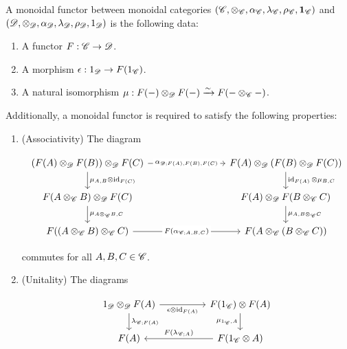 \begin{definition} A monoidal functor between monoidal categories $(\mathscr{C},\otimes_{\mathscr{C}}, \alpha_{\mathscr{C}},\lambda_{\mathscr{C}},\rho_{\mathscr{C}},\mathbf{1}_{\mathscr{C}})$ and $(\mathscr{D},\otimes_{\mathscr{D}},\alpha_{\mathscr{D}},\lambda_{\mathscr{D}},\rho_{\mathscr{D}},1_{\mathscr{D}})$ is the following data:

\begin{enumerate}
\item A functor $F: \mathscr{C}\to \mathscr{D}$.
\item A morphism $\epsilon:1_{\mathscr{D}}\to F(1_{\mathscr{C}})$.
\item A natural isomorphism $\mu: F(\--)\otimes_{\mathscr{D}}F(\--)\xrightarrow{\sim}F(\--\otimes_{\mathscr{C}}\--)$.
\end{enumerate}

Additionally, a monoidal functor is required to satisfy the following properties:

\begin{enumerate}
\item (Associativity) The diagram

\[\begin{tikzcd}
	{(F(A)\otimes_{\Dcat}F(B))\otimes_{\Dcat}F(C)} &&& {F(A)\otimes_{\Dcat}(F(B)\otimes_{\Dcat}F(C))} \\
	{F(A\otimes_{\C}B)\otimes_{\Dcat}F(C)} &&& {F(A)\otimes_{\Dcat}F(B\otimes_{\C}C)} \\
	{F((A\otimes_{\C} B)\otimes_{\C}C)} && {} & {F(A\otimes_{\C}(B\otimes_{\C}C))}
	\arrow["{\mu_{A,B}\otimes \id_{F(C)}}", from=1-1, to=2-1]
	\arrow["{\mu_{A\otimes_{\C}B,C}}", from=2-1, to=3-1]
	\arrow["{\mu_{A,B\otimes_{\C}C}}", from=2-4, to=3-4]
	\arrow["{\id_{F(A)}\otimes\mu_{B,C}}", from=1-4, to=2-4]
	\arrow["{F(\alpha_{\C;A,B,C})}"{description}, from=3-1, to=3-4]
	\arrow["{\alpha_{\Dcat;F(A),F(B),F(C)}}"{description}, from=1-1, to=1-4]
\end{tikzcd}\]

commutes for all $A,B,C\in \mathscr{C}$.

\item (Unitality) The diagrams

\[\begin{tikzcd}
	{1_{\Dcat}\otimes_{\Dcat}F(A)} && {F(1_{\C})\otimes F(A)} \\
	{F(A)} && {F(1_{\C}\otimes A)}
	\arrow["{\lambda_{\C;F(A)}}", from=1-1, to=2-1]
	\arrow["{F(\lambda_{\C;A})}"', from=2-3, to=2-1]
	\arrow["{\mu_{1_{\C},A}}"', from=1-3, to=2-3]
	\arrow["{\epsilon\otimes \id_{F(A)}}"', from=1-1, to=1-3]
\end{tikzcd}\]


\end{enumerate}
\end{definition}
